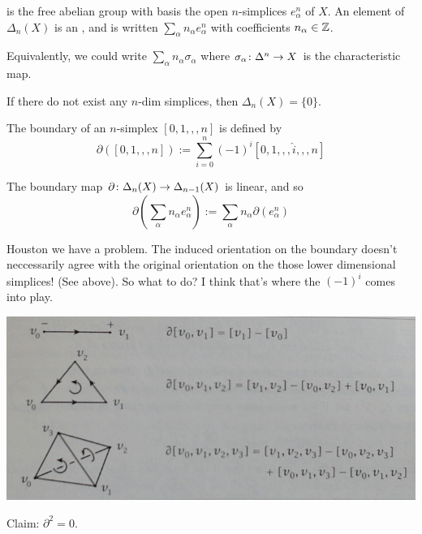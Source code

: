 \documentclass[11pt,leqno,oneside]{amsart}
\numberwithin{thm}{section}
\renewcommand{\d}{\partial}
\begin{document}
\begin{defn}
    is the free abelian
  group with basis the open $n$-simplices $e_\alpha^n$ of $X$.  An
  element of $\Delta_n(X)$ is an , and is written
  $\sum_\alpha n_\alpha e_\alpha^n$ with coefficients
  $n_\alpha \in {\mathbb Z}$.
\end{defn}
\begin{rmk}
  Equivalently, we could write $\sum_\alpha n_\alpha \sigma_\alpha$
  where $\sigma_\alpha \colon \Delta^n \to X$ is the characteristic
  map.

  If there do not exist any $n$-dim simplices, then
  $\Delta_n(X) = \{0\}$.
\end{rmk}

\begin{defn}
  The boundary of an $n$-simplex $[0, 1,,, n]$ is defined by
  $$\d([0, 1,,, n]) := \sum_{i=0}^n (-1)^i [0, 1,,, \hat{i},,, n]$$
\end{defn}
\begin{defn}
  The boundary map $\d \from \Delta_n(X) \to \Delta_{n-1}(X)$ is
  linear, and so
  $$\d(\sum_\alpha n_\alpha e_\alpha^n) := \sum_\alpha n_\alpha
  \d(e_\alpha^n)$$
\end{defn}

Houston we have a problem.  The induced orientation on the boundary
doesn't neccessarily agree with the original orientation on the those
lower dimensional simplices!  (See above).  So what to do?  I think
that's where the $(-1)^i$ comes into play.

\begin{example}[Hatcher, p.105]
  \quad

  \includegraphics[scale=0.5]{images/boundary-of-oriented-simplex}
\end{example}

Claim: $\d^2 = 0$.
\end{document}
